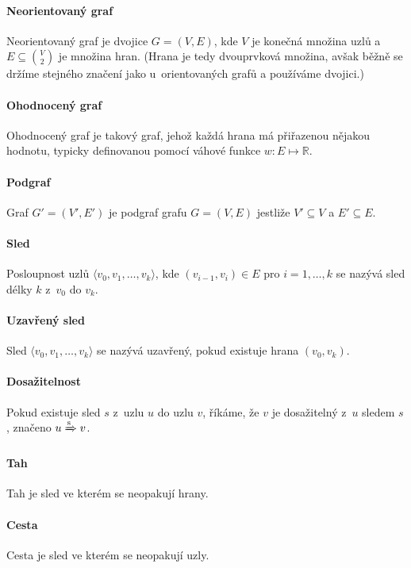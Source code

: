 \paragraph*{Neorientovaný graf} Neorientovaný graf je dvojice $G = (V, E)$, kde $V$ je konečná množina uzlů a $E \subseteq \binom{V}{2}$ je množina hran. (Hrana je tedy dvouprvková množina, avšak běžně se držíme stejného značení jako u~orientovaných grafů a používáme dvojici.)

\paragraph*{Ohodnocený graf} Ohodnocený graf je takový graf, jehož každá hrana má přiřazenou nějakou hodnotu, typicky definovanou pomocí váhové funkce $w : E \mapsto \mathbb{R}$.

\paragraph*{Podgraf} Graf $G' = (V', E')$ je podgraf grafu $G = (V, E)$ jestliže $V' \subseteq V$ a $E' \subseteq E$.

\paragraph*{Sled} Posloupnost uzlů $\langle v_0, v_1, \dots, v_k \rangle$, kde $(v_{i-1}, v_i) \in E$ pro $i = 1, \dots, k$ se nazývá sled délky $k$ z~$v_0$ do $v_k$.

\paragraph*{Uzavřený sled} Sled $\langle v_0, v_1, \dots, v_k \rangle$ se nazývá uzavřený, pokud existuje hrana $(v_0, v_k)$.

\paragraph*{Dosažitelnost} Pokud existuje sled $s$ z~uzlu $u$ do uzlu $v$, říkáme, že $v$ je dosažitelný z~$u$ sledem $s$, značeno $u \xRightarrow{\text{s}} v$.

\paragraph*{Tah} Tah je sled ve kterém se neopakují hrany.

\paragraph*{Cesta} Cesta je sled ve kterém se neopakují uzly.

